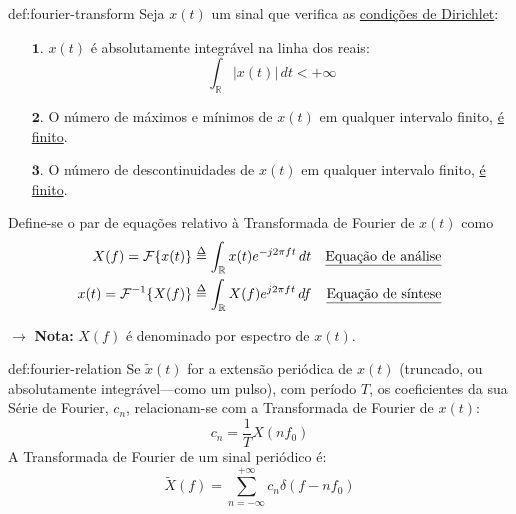\begin{theo}{def:fourier-transform}\label{def:fourier-transform}
    Seja $x(t)$ um sinal que verifica as \underline{condições de Dirichlet}:
    
    \vspace{-0.5em}
    \begin{enumerate}[leftmargin=2em]
        \item[$\pmb{1.}$] $x(t)$ é absolutamente integrável na linha dos reais:
        $$
            \int_{\mathbb{R}} \left|x(t)\right|\, dt < +\infty
        $$
        \item[$\pmb{2.}$] O número de máximos e mínimos de $x(t)$ em qualquer intervalo finito, \underline{é finito}.
        
        \item[$\pmb{3.}$] O número de descontinuidades de $x(t)$ em qualquer intervalo finito, \underline{é finito}.
    \end{enumerate}

    \noindent Define-se o par de equações relativo à Transformada de Fourier de $x(t)$ como
    \begin{align*}
        X(f) = \mathcal{F}\{x(t)\} &\delequal \int_{\mathbb{R}} x(t) e^{-j2\pi ft}\, dt & \text{\underline{Equação de análise}}\\
        x(t) = \mathcal{F}^{-1}\{X(f)\} &\delequal \int_{\mathbb{R}} X(f) e^{j2\pi ft}\, df & \text{\underline{Equação de síntese}}
    \end{align*}%

    \vspace{0.5em}
    \noindent $\pmb{\rightarrow}$ \textbf{Nota:} $X(f)$ é denominado por espectro de $x(t)$.
\end{theo}

\begin{theo}{def:fourier-relation}\label{def:fourier-relation}
\noindent Se $\tilde{x}(t)$ for a extensão periódica de $x(t)$ (truncado, ou absolutamente integrável---como um pulso), com período $T$, os coeficientes da sua Série de Fourier, $c_n$, relacionam-se com a Transformada de Fourier de $x(t)$:
    $$
        c_n = \frac{1}{T} X(nf_0)
    $$
    A Transformada de Fourier de um sinal periódico é: 
    $$
        \tilde{X}(f) = \sum_{n=-\infty}^{+\infty} c_n \delta(f - n f_0)
    $$
\end{theo}

